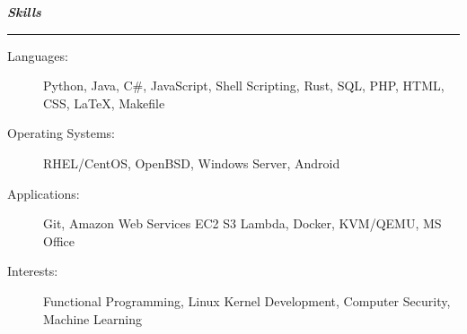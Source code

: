 \documentclass[letterpaper,11pt]{article}
\newcommand{\mysection}[1]{\vspace{5pt} {\bfseries \textsl{#1}} \\ {\color{gray} \rule[5pt]{\textwidth}{1pt}}}
\begin{document}
\mysection{Skills}
\begin{description}
    \item[Languages:]
        Python, Java, C\#, JavaScript, Shell Scripting, Rust, SQL, PHP, HTML, CSS, \LaTeX{}, Makefile
    \item[Operating Systems:]
        RHEL/CentOS, OpenBSD, Windows Server, Android
    \item[Applications:]
        Git, Amazon Web Services EC2 S3 Lambda, Docker, KVM/QEMU, MS Office
    \item[Interests:]
        Functional Programming, Linux Kernel Development, Computer Security, Machine Learning
\end{description}
\end{document}

